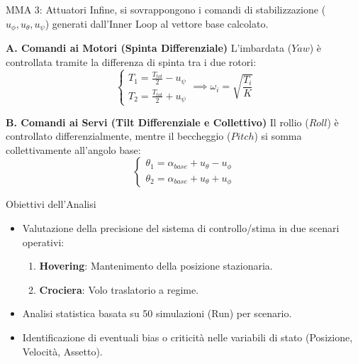 \documentclass[aspectratio=169]{beamer} %
\begin{document}
\begin{frame}{MMA 3: Attuatori}
    Infine, si sovrappongono i comandi di stabilizzazione ($u_\phi, u_\theta, u_\psi$) generati dall'Inner Loop al vettore base calcolato.

    \vspace{0.2cm}
    \textbf{A. Comandi ai Motori (Spinta Differenziale)}
    L'imbardata ($Yaw$) è controllata tramite la differenza di spinta tra i due rotori:
    \begin{equation}
        \begin{cases}
            T_{1} = \frac{T_{tot}}{2} - u_{\psi} \\
            T_{2}  = \frac{T_{tot}}{2} + u_{\psi}
        \end{cases}
        \implies \omega_{i} = \sqrt{\frac{T_{i}}{K}}
    \end{equation}

    \vspace{0.2cm}
    \textbf{B. Comandi ai Servi (Tilt Differenziale e Collettivo)}
    Il rollio ($Roll$) è controllato differenzialmente, mentre il beccheggio ($Pitch$) si somma collettivamente all'angolo base:
    \begin{equation}
        \begin{cases}
            \theta_{1} = \alpha_{base} + u_{\theta} - u_{\phi} \\
            \theta_{2} = \alpha_{base} + u_{\theta} + u_{\phi}
        \end{cases}
    \end{equation}
    
\end{frame}


\begin{frame}{Obiettivi dell'Analisi}
    \begin{itemize}
        \item Valutazione della precisione del sistema di controllo/stima in due scenari operativi:
        \begin{enumerate}
            \item \textbf{Hovering}: Mantenimento della posizione stazionaria.
            \item \textbf{Crociera}: Volo traslatorio a regime.
        \end{enumerate}
        \item Analisi statistica basata su 50 simulazioni (Run) per scenario.
        \item Identificazione di eventuali bias o criticità nelle variabili di stato (Posizione, Velocità, Assetto).
    \end{itemize}
\end{frame}
\end{document}
